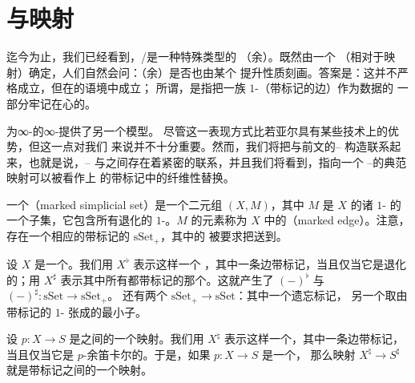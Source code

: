 \section{\trMarkedSimplicialSet{}与\trMarkedAnodyne{}映射}
\label{sec:marked-simplicial-sets}

迄今为止，我们已经看到，\trLeftFibration{}/\trRightFibration{}是一种特殊类型的%
（余）\trCartesianFibration{}。既然\trLeftFibration{}由一个\trRightLiftingProperty{}%
（相对于\trLeftAnodyne{}映射）确定，人们自然会问：（余）\trCartesianFibration{}是否也由某个%
提升性质刻画。答案是：这并不严格成立，但在\trMarkedSimplicialSet{}的语境中成立；
所谓\trMarkedSimplicialSet{}，是指把一族 $1$-\trSimplex{}（带标记的边）作为数据的
一部分牢记在心的\trSimplicialSet{}。

\trMarkedSimplicialSet{}为∞-\trCategories{}的∞-\trCategory{}提供了另一个模型。
尽管这一表现方式比若亚尔\trModelStructure{}具有某些技术上的优势，但这一点对我们
来说并不十分重要。然而，我们将把\trMarkedSimplicialSet{}与前文的\trDwyer{}--%
\trKan{}\trLocalization{}构造联系起来，也就是说，\trDwyer{}--\trKan{}%
\trLocalization{}与\trMarkedEquivalence{}之间存在着紧密的联系，并且我们将看到，指向一个%
\trDwyer{}--\trKan{}\trLocalization{}的典范映射可以被看作\trMarkedSimplicialSet{}上%
的带标记\trModelStructure{}中的纤维性替换。

\begin{definition}\label{def:marked-simplicial-set}
一个\emph{\trMarkedSimplicialSet{}}（marked simplicial set）是一个二元组
$(X, M)$，其中 $M$ 是 $X$ 的诸 $1$-\trSimplex{} 的一个子集，它包含所有退化的
$1$-\trSimplex{}。$M$ 的元素称为 $X$ 中的\emph{\trMarkedEdge{}}（marked edge）。注意，
存在一个相应的带标记\trSimplicialSet{}的\trCategory{} $\mathrm{sSet}_+$，其中的%
\trMorphism{}被要求把\trMarkedEdge{}送到\trMarkedEdge{}。
\end{definition}

\begin{example*}
设 $X$ 是一个\trSimplicialSet{}。我们用 $X^\flat$ 表示这样一个%
\trMarkedSimplicialSet{}，其中一条边带标记，当且仅当它是退化的；用 $X^\sharp$
表示其中所有\trMorphism{}都带标记的那个\trMarkedSimplicialSet{}。这就产生了%
\trFunctor{} $(-)^\flat$ 与 $(-)^\sharp\colon \mathrm{sSet} \to \mathrm{sSet}_+$。
还有两个\trFunctor{} $\mathrm{sSet}_+ \to \mathrm{sSet}$：其中一个遗忘标记，
另一个取由带标记的 $1$-\trSimplex{} 张成的最小子\trSimplicialSet{}。
\end{example*}

\begin{example*}
设 $p\colon X \to S$ 是\trSimplicialSet{}之间的一个映射。我们用 $X^\natural$
表示这样一个\trMarkedSimplicialSet{}，其中一条边带标记，当且仅当它是
$p$-余笛卡尔的。于是，如果 $p\colon X \to S$ 是一个\trCocartesianFibration{}，
那么映射 $X^\natural \to S^\sharp$ 就是带标记\trSimplicialSet{}之间的一个映射。
\end{example*}

